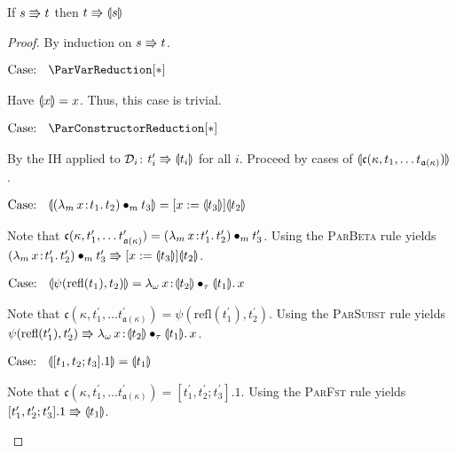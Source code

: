\begin{lemma}
    If $s \Rrightarrow t$ then $t \Rrightarrow \llparenthesis {s} \rrparenthesis$
    \label{lem:a:par_triangle}
\end{lemma}
\begin{proof}
    By induction on $s \Rrightarrow t$.

    $\text{Case: }\begin{array}{c} \ParVarReduction[*] \end{array}$
    \begin{proofcase}
        Have $\llparenthesis {x} \rrparenthesis = x$.
        Thus, this case is trivial.
    \end{proofcase}

    $\text{Case: }\begin{array}{c} \ParConstructorReduction[*] \end{array}$
    \begin{proofcase}
        By the IH applied to $\mathcal{D}_{i}$: $t_i^\prime \Rrightarrow \llparenthesis {t_i} \rrparenthesis$ for all $i$.
        Proceed by cases of $\llparenthesis {\mathfrak{c}(\kappa, t_1, \ldots t_{\mathfrak{a}(\kappa)})} \rrparenthesis$.

        $\text{Case: }\begin{array}{c} \llparenthesis {({\lambda_m}\, x\! : \! t_1.\, t_2) \bullet_{m} t_3} \rrparenthesis = [x := \llparenthesis {t_3} \rrparenthesis]\llparenthesis {t_2} \rrparenthesis \end{array}$
        \begin{proofcase}
            Note that $\mathfrak{c}(\kappa, t_1^\prime, \ldots t^\prime_{\mathfrak{a}(\kappa)}) = ({\lambda_m}\, x\! : \! t_1^\prime.\, t_2^\prime) \bullet_{m} t_3^\prime$.
            Using the \textsc{ParBeta} rule yields $({\lambda_m}\, x\! : \! t_1^\prime.\, t_2^\prime) \bullet_{m} t_3^\prime \Rrightarrow [x := \llparenthesis {t_3} \rrparenthesis]\llparenthesis {t_2} \rrparenthesis$.
        \end{proofcase}

        $\text{Case: }\begin{array}{c} \llparenthesis {\psi(\text{refl}(t_1), t_2)} \rrparenthesis = {\lambda_\omega}\, x\! : \! \llparenthesis {t_2} \rrparenthesis \bullet_{\tau} \llparenthesis {t_1} \rrparenthesis.\, x \end{array}$
        \begin{proofcase}
            Note that $\mathfrak{c}(\kappa, t_1^\prime, \ldots t^\prime_{\mathfrak{a}(\kappa)}) = \psi(\text{refl}(t_1^\prime), t_2^\prime)$.
            Using the \textsc{ParSubst} rule yields $\psi(\text{refl}(t_1^\prime), t_2^\prime) \Rrightarrow {\lambda_\omega}\, x\! : \! \llparenthesis {t_2} \rrparenthesis \bullet_{\tau} \llparenthesis {t_1} \rrparenthesis.\, x$.
        \end{proofcase}

        $\text{Case: }\begin{array}{c} \llparenthesis {[t_1, t_2; t_3].1} \rrparenthesis = \llparenthesis {t_1} \rrparenthesis \end{array}$
        \begin{proofcase}
            Note that $\mathfrak{c}(\kappa, t_1^\prime, \ldots t^\prime_{\mathfrak{a}(\kappa)}) = [t_1^\prime, t_2^\prime; t_3^\prime].1$.
            Using the \textsc{ParFst} rule yields $[t_1^\prime, t_2^\prime; t_3^\prime].1 \Rrightarrow \llparenthesis {t_1} \rrparenthesis$.
        \end{proofcase}


\end{proofcase}
\end{proof}
